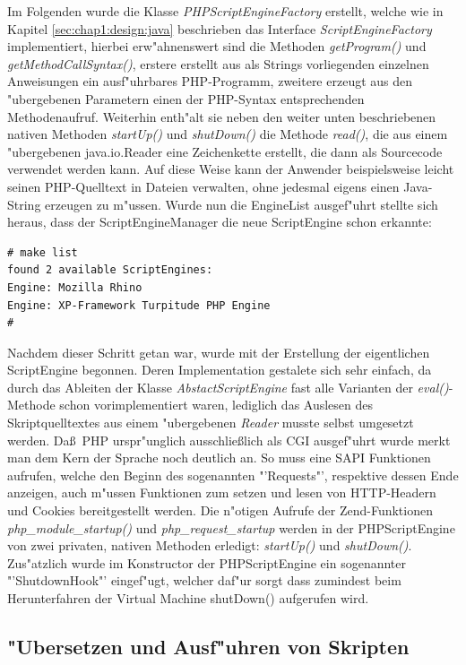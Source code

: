 Im Folgenden wurde die Klasse \emph{PHPScriptEngineFactory} erstellt, welche wie in Kapitel
\ref{sec:chap1:design:java} beschrieben
das Interface \emph{ScriptEngineFactory} implementiert, hierbei erw"ahnenswert sind die Methoden 
\emph{getProgram()} und \emph{getMethodCallSyntax()}, erstere erstellt aus als Strings vorliegenden
einzelnen Anweisungen ein ausf"uhrbares PHP-Programm, zweitere erzeugt aus den "ubergebenen Parametern
einen der PHP-Syntax entsprechenden Methodenaufruf. Weiterhin enth"alt sie neben den weiter unten
beschriebenen nativen Methoden \emph{startUp()} und \emph{shutDown()} die Methode \emph{read()}, die
aus einem "ubergebenen java.io.Reader eine Zeichenkette erstellt, die dann als Sourcecode verwendet
werden kann. Auf diese Weise kann der Anwender beispielsweise leicht seinen PHP-Quelltext in Dateien
verwalten, ohne jedesmal eigens einen Java-String erzeugen zu m"ussen.
Wurde nun die EngineList ausgef"uhrt stellte sich heraus, dass der ScriptEngineManager die neue ScriptEngine schon erkannte:
\begin{lstlisting}[caption=Neue ScriptEngine]
# make list
found 2 available ScriptEngines:
Engine: Mozilla Rhino
Engine: XP-Framework Turpitude PHP Engine
#
\end{lstlisting}

Nachdem dieser Schritt getan war, wurde mit der Erstellung der eigentlichen ScriptEngine begonnen. Deren
Implementation gestalete sich sehr einfach, da durch das Ableiten der Klasse \emph{AbstactScriptEngine} 
fast alle Varianten der \emph{eval()}-Methode schon vorimplementiert waren, lediglich das Auslesen des
Skriptquelltextes aus einem "ubergebenen \emph{Reader} musste selbst umgesetzt werden. 
Da\ss\ PHP urspr"unglich ausschlie\ss lich als CGI ausgef"uhrt wurde merkt man dem Kern der Sprache noch
deutlich an. So muss eine SAPI Funktionen aufrufen, welche den Beginn des sogenannten "'Requests"', respektive
dessen Ende anzeigen, auch m"ussen Funktionen zum setzen und lesen von HTTP-Headern und Cookies bereitgestellt
werden. Die n"otigen Aufrufe der Zend-Funktionen \emph{php\_module\_startup()} und \emph{php\_request\_startup}
werden in der PHPScriptEngine von zwei privaten, nativen Methoden erledigt: \emph{startUp()} und \emph{shutDown()}. 
Zus"atzlich wurde im Konstructor der PHPScriptEngine ein sogenannter "'ShutdownHook"' eingef"ugt, welcher daf"ur 
sorgt dass zumindest beim Herunterfahren der Virtual Machine shutDown() aufgerufen wird.

\subsection{"Ubersetzen und Ausf"uhren von Skripten}
\label{sec:chap1:impl:2}

